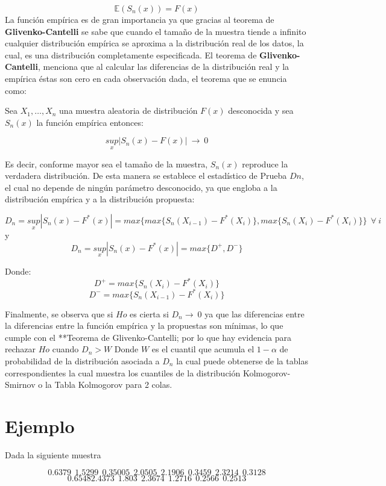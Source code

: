 \documentclass[a4paper,oneside,openany]{book}
\begin{document}
\[\mathbb{E}(S_{n}(x))=F(x)\] La función empírica es de gran importancia
ya que gracias al teorema de \textbf{Glivenko-Cantelli} se sabe que
cuando el tamaño de la muestra tiende a infinito cualquier distribución
empírica se aproxima a la distribución real de los datos, la cual, es
una distribución completamente especificada. El teorema de
\textbf{Glivenko-Cantelli}, menciona que al calcular las diferencias de
la distribución real y la empírica éstas son cero en cada observación
dada, el teorema que se enuncia como:

Sea \(X_{1},\ldots,X_{n}\) una muestra aleatoria de distribución
\(F(x)\) desconocida y sea \(S_{n}(x)\) la función empírica entonces:

\[\underset{x}{sup}|S_{n}(x)-F(x)| \ \longrightarrow \ 0\]

Es decir, conforme mayor sea el tamaño de la muestra, \(S_{n}(x)\)
reproduce la verdadera distribución. De esta manera se establece el
estadístico de Prueba \(Dn\), el cual no depende de ningún parámetro
desconocido, ya que engloba a la distribución empírica y a la
distribución propuesta:

\[D_{n}=\underset{x}{sup}|S_{n}(x)-F^*(x)|=max \{ max \{ S_{n}(X_{i-1})-F^*(X_{i})\},max \{ S_{n}(X_{i})-F^*(X_{i})\}\} \ \ \forall \ i\]
y \[D_{n}=\underset{x}{sup}|S_{n}(x)-F^*(x)|=max\{ D^+,D^-\}\]

Donde: \[D^+= max \{ S_{n}(X_{i})-F^*(X_{i})\}\]
\[D^-= max \{ S_{n}(X_{i-1})-F^*(X_{i})\}\]

Finalmente, se observa que si \(Ho\) es cierta si
\(D_{n} \longrightarrow \ 0\) ya que las diferencias entre la
diferencias entre la función empírica y la propuestas son mínimas, lo
que cumple con el **Teorema de Glivenko-Cantelli; por lo que hay
evidencia para rechazar \(Ho\) cuando \(D_{n} > W\) Donde \(W\) es el
cuantil que acumula el \(1- \alpha\) de probabilidad de la distribución
asociada a \(D_{n}\) la cual puede obtenerse de la tablas
correspondientes la cual muestra los cuantiles de la distribución
Kolmogorov-Smirnov o la Tabla Kolmogorov para 2 colas.

\section{Ejemplo}\label{ejemplo-12}

Dada la siguiente muestra

\[0.6379 \ \ 1.5299 \ \ 0.35005 \ \ 2.0505 \ \ 2.1906 \ \ 0.3459 \ \ 2.3214 \ \ 0.3128\]
\[ 0.65482.4373 \ \ 1.803 \ \ 2.3674 \ \ 1.2716 \ \ 0.2566 \ \ 0.2513\]
\end{document}
